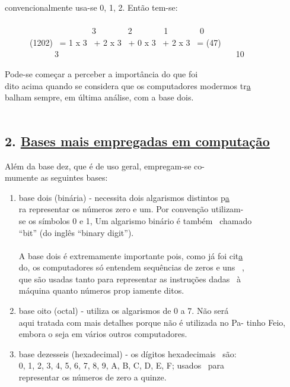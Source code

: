\documentclass[a4paper,12pt]{article}
\begin{document}
\newpage

\noindent convencionalmente usa-se 0, 1, 2. Então tem-se:\\
\\[-1em]
\phantom \ \ \ \ \ \ \ \ \ \ \ \ \ \ \ \ \ \ \ \ \ 3 \ \ \ \ \ \ \ 2 \ \ \ \ \ \ \ 1 \ \ \ \ \ \ \ 0\\[-1em]
\phantom \ \ \ \ \ \ (1202) \ = 1 x 3 \ + 2 x 3 \ + 0 x 3 \ + 2 x 3 \ = (47)\\[-1em]
\phantom \ \ \ \ \ \ \ \ \ \ \ \ 3 \ \ \ \ \ \ \ \ \ \ \ \ \ \ \ \ \ \ \ \ \ \ \ \ \ \ \ \ \ \ \ \ \ \ \ \ \ \ \ \ \ \ 10\\
\par
Pode-se começar a perceber a importância do que \hfill foi\\
dito acima quando se considera que os computadores modermos tr\uline a\\
balham sempre, em última análise, com a base dois.\\
\\[0.5em]

\subsection*{2. \uline{Bases mais empregadas em computação}}

Além da base dez, que é de uso geral, empregam-se co-\\
mumente as seguintes bases:

\begin{enumerate}[label=\alph*), align=left, leftmargin=1.5em, labelsep=-0.5em, itemsep=1em, topsep=1.5em]
\item base dois (binária) - necessita dois algarismos distintos p\uline a\\
ra representar os números zero e um. Por convenção utilizam-\\
se os símbolos 0 e 1, Um algarismo binário é também \ chamado\\
``bit'' (do inglês ``binary digit'').\\
\\
A base dois é extremamente importante pois, como já foi cit\uline a\\
do, os computadores só entendem sequências de zeros e uns \ ,\\ 
que são usadas tanto para representar as instruções dadas \ à\\
máquina quanto números prop iamente ditos.
\item base oito (octal) - utiliza os algarismos de 0 a 7. Não será\\
aqui tratada com mais detalhes porque não é utilizada no Pa-
tinho Feio, embora o seja em vários outros computadores.
\item base dezesseis (hexadecimal) - os dígitos hexadecimais \ são:\\
0, 1, 2, 3, 4, 5, 6, 7, 8, 9, A, B, C, D, E, F; usados \ para\\
representar os números de zero a quinze.
\end{enumerate}
\end{document}
